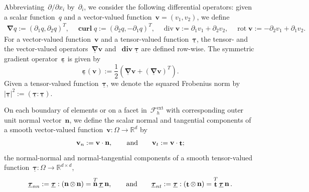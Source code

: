 \documentclass[a4paper,twoside,10pt]{article}
\theoremstyle{plain}
\theoremstyle{remark}
\theoremstyle{definition}
\numberwithin{equation}{section}
\numberwithin{figure}{section}
\newcommand{\Rbbd}{\mathbb{R}^d}
\newcommand{\Rbbdd}{\mathbb{R}^{d\times d}}
\newcommand{\taubf}{\underline{\boldsymbol{\tau}}}
\newcommand{\vbf}{\mathbf{v}}
\DeclareMathOperator{\dive}{div}
\DeclareMathOperator{\divebf}{\mathbf{div}}
\DeclareMathOperator{\rot}{rot}
\DeclareMathOperator{\curlbf}{\mathbf{curl}}
\DeclareMathOperator{\curlbfun}{\underline{\mathbf{curl}}}
\newcommand{\nbf}{\mathbf{n}}
\DeclareMathOperator{\norm}{\bf{n}}
\DeclareMathOperator{\tang}{\bf{t}}
\newcommand{\nablabf}{\boldsymbol{\nabla}}
\newcommand{\epsbfun}{\underline{\boldsymbol{\varepsilon}}}
\newcommand{\nablabfun}{\underline{\boldsymbol{\nabla}}}
\newcommand{\FcalhB}{\mathcal{F}_h^{\text{ext}}}
\newcommand{\vbfn}{\vbf_{n}}
\newcommand{\vbft}{\vbf_{t}}
\newcommand{\taubfnn}{\taubf_{n n}}
\newcommand{\taubfnt}{\taubf_{n t}}
\begin{document}
Abbreviating~$\partial/\partial x_i$ by~$\partial_i$,
we consider the following differential operators:
given a scalar function~$q$
and a vector-valued function~$\vbf = (v_1, v_2)$,
we define
\begin{gather*}
\nablabf q := (\partial_1 q, \partial_2 q)^T, \quad
\curlbf q := (\partial_2 q, -\partial_1 q)^T, \quad
\dive \vbf := \partial_1 v_1 + \partial_2 v_2, \quad
\rot \vbf := -\partial_2 v_1 + \partial_1 v_2.
\end{gather*}
For a vector-valued function~$\vbf$
and a tensor-valued function~$\taubf$,
the tensor- and the vector-valued
operators~$\nablabfun \vbf$ and~$\divebf \taubf$
are defined row-wise.
The symmetric gradient operator~$\epsbfun$ is given by
\begin{equation*}
\epsbfun(\vbf) := \frac12 (\nablabfun \vbf + (\nablabfun \vbf)^T).
\end{equation*}
Given a tensor-valued function~$\taubf$,
we denote the squared Frobenius norm by
$|\taubf|^2 := (\taubf : \taubf)$.

On each boundary of elements
or on a facet in~$\FcalhB$
with corresponding outer unit normal vector~$\nbf$,
we define the scalar normal and tangential components of a smooth vector-valued function~$\vbf: \Omega \to \Rbbd$ by
\begin{equation*}
\vbfn := \vbf \cdot \norm,
\qquad\text{and}\qquad
\vbft := \vbf  \cdot \tang;
\end{equation*}
the normal-normal and normal-tangential components of
a smooth tensor-valued function~$\taubf: \Omega \to \Rbbdd$,
\begin{equation*}
\taubfnn := \taubf : (\norm \otimes \norm) = \norm^T \taubf \norm,
\qquad\text{and}\qquad
\taubfnt := \taubf : {(\tang \otimes \norm)} = \tang^T \taubf \norm.
\end{equation*}
\end{document}

